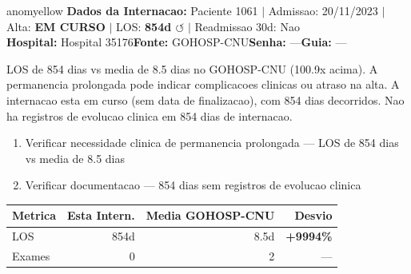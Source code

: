 \documentclass[a4paper,10pt]{article}
\begin{document}
\begin{anomalycard}[Internacao 216506 | GOHOSP-CNU | MODERADO (z=2.02)]{anomyellow}
\textbf{Dados da Internacao:} Paciente 1061 $\mid$ Admissao: 20/11/2023 $\mid$ Alta: \textcolor{anomorange}{\textbf{EM CURSO}} $\mid$ LOS: \textbf{854d \textcolor{anomorange}{$\circlearrowleft$}} $\mid$ Readmissao 30d: Nao\\
\textbf{Hospital:} Hospital 35176\quad\textbf{Fonte:} GOHOSP-CNU\quad\textbf{Senha:} ---\quad\textbf{Guia:} ---\\
\vspace{2pt}\begin{tcolorbox}[colback=severityred!20,colframe=anomyellow,title={\textbf{Interpretacao de Negocio}},fonttitle=\bfseries\small,left=4pt,right=4pt,top=3pt,bottom=3pt]
{\small LOS de 854 dias vs media de 8.5 dias no GOHOSP-CNU (100.9x acima). A permanencia prolongada pode indicar complicacoes clinicas ou atraso na alta. A internacao esta em curso (sem data de finalizacao), com 854 dias decorridos. Nao ha registros de evolucao clinica em 854 dias de internacao.}
\end{tcolorbox}
\begin{tcolorbox}[colback=severityyellow!30,colframe=anomorange,title={\textbf{Recomendacoes Especificas}},fonttitle=\bfseries\small,left=4pt,right=4pt,top=3pt,bottom=3pt]
\begin{enumerate}[nosep,leftmargin=16pt]
\item {\small Verificar necessidade clinica de permanencia prolongada --- LOS de 854 dias vs media de 8.5 dias}
\item {\small Verificar documentacao --- 854 dias sem registros de evolucao clinica}
\end{enumerate}
\end{tcolorbox}
\begin{center}\begin{tabular}{l r r r}\toprule\textbf{Metrica} & \textbf{Esta Intern.} & \textbf{Media GOHOSP-CNU} & \textbf{Desvio} \\\midrule
LOS & 854d & 8.5d & \textcolor{anomred}{\textbf{+9994\%}} \\
Exames & 0 & 2 & --- \\
\bottomrule\end{tabular}\end{center}


\end{anomalycard}
\end{document}
